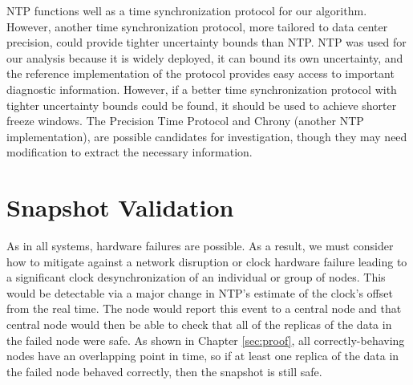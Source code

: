 NTP functions well as a time synchronization protocol for our algorithm. 
However, another time synchronization protocol, more tailored to data center precision, could provide tighter uncertainty bounds than NTP. NTP
was used for our analysis because it is widely deployed, it can bound
its own uncertainty, and the reference implementation of the protocol
provides easy access to important diagnostic information. However, if a better time synchronization protocol with tighter uncertainty bounds could be found, it should be used to achieve shorter freeze windows. The Precision Time Protocol and Chrony (another NTP implementation), are possible candidates for investigation, though they may need modification to extract the necessary information.

\section{Snapshot Validation}

As in all systems, hardware failures are possible. As a result, we
must consider how to mitigate against a network disruption or clock
hardware failure leading to a significant clock desynchronization of
an individual or group of nodes. This would be detectable via a major
change in NTP's estimate of the clock's offset from the real time.
The node would report this event to a central node and that central node would then be able to check that all of the replicas of the data in the failed node were safe. As shown in Chapter \ref{sec:proof}, all correctly-behaving nodes have an
overlapping point in time, so if at least one replica of the data in the 
failed node behaved correctly, then the snapshot is still safe.


